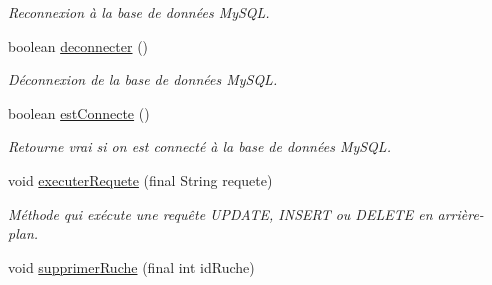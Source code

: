 \begin{DoxyCompactItemize}
\begin{DoxyCompactList}\small\item\em Reconnexion à la base de données My\+S\+QL. \end{DoxyCompactList}\item 
boolean \hyperlink{classfr_1_1campus_1_1laurainc_1_1honeybee_1_1_base_de_donnees_ae022ff0b4923d637f8d392cb908aa252}{deconnecter} ()
\begin{DoxyCompactList}\small\item\em Déconnexion de la base de données My\+S\+QL. \end{DoxyCompactList}\item 
boolean \hyperlink{classfr_1_1campus_1_1laurainc_1_1honeybee_1_1_base_de_donnees_a735f54c2c183a595c9a9a5ba947491f5}{est\+Connecte} ()
\begin{DoxyCompactList}\small\item\em Retourne vrai si on est connecté à la base de données My\+S\+QL. \end{DoxyCompactList}\item 
void \hyperlink{classfr_1_1campus_1_1laurainc_1_1honeybee_1_1_base_de_donnees_a421bffe6f14c01bee64695e7b6a9745d}{executer\+Requete} (final String requete)
\begin{DoxyCompactList}\small\item\em Méthode qui exécute une requête U\+P\+D\+A\+TE, I\+N\+S\+E\+RT ou D\+E\+L\+E\+TE en arrière-\/plan. \end{DoxyCompactList}\item 
void \hyperlink{classfr_1_1campus_1_1laurainc_1_1honeybee_1_1_base_de_donnees_a7b0977566d74684fab184f7a5efce3c8}{supprimer\+Ruche} (final int id\+Ruche)
\end{DoxyCompactItemize}
